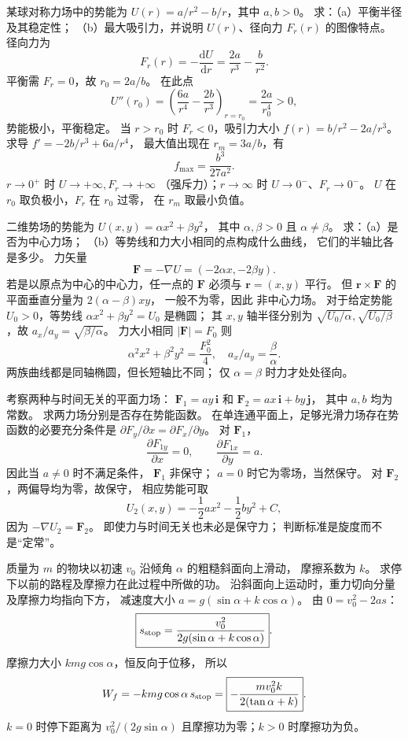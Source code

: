 某球对称力场中的势能为
$U(r)=a/r^2-b/r$，其中 $a,b>0$。
求：（a）平衡半径及其稳定性；
（b）最大吸引力，并说明 $U(r)$、径向力 $F_r(r)$ 的图像特点。
\exsolution
径向力为
\[
F_r(r)=-\frac{\mathrm dU}{\mathrm dr}
=\frac{2a}{r^3}-\frac{b}{r^2}.
\]
平衡需 $F_r=0$，故
$\boxed{r_0=2a/b}$。
在此点
\[
U''(r_0)=\left(\frac{6a}{r^4}
-\frac{2b}{r^3}\right)_{r=r_0}
=\frac{2a}{r_0^4}>0,
\]
势能极小，平衡稳定。
当 $r>r_0$ 时 $F_r<0$，吸引力大小
$f(r)=b/r^2-2a/r^3$。
求导 $f'=-2b/r^3+6a/r^4$，
最大值出现在 $r_m=3a/b$，有
\[
\boxed{f_{\max}=\frac{b^3}{27a^2}}.
\]
\excheck $r\to0^+$ 时 $U\to+\infty,F_r\to+\infty$
（强斥力）；$r\to\infty$ 时 $U\to0^-$、$F_r\to0^-$。
$U$ 在 $r_0$ 取负极小，$F_r$ 在 $r_0$ 过零，
在 $r_m$ 取最小负值。

二维势场的势能为
$U(x,y)=\alpha x^2+\beta y^2$，
其中 $\alpha,\beta>0$ 且 $\alpha\ne\beta$。
求：（a）是否为中心力场；
（b）等势线和力大小相同的点构成什么曲线，
它们的半轴比各是多少。
\exsolution
力矢量
\[
\bm F=-\nabla U=(-2\alpha x,-2\beta y).
\]
若是以原点为中心的中心力，任一点的 $\bm F$
必须与 $\bm r=(x,y)$ 平行。
但 $\bm r\times\bm F$
的平面垂直分量为 $2(\alpha-\beta)xy$，
一般不为零，因此
$\boxed{\text{非中心力场}}$。
对于给定势能 $U_0>0$，等势线
$\alpha x^2+\beta y^2=U_0$ 是椭圆；
其 $x,y$ 轴半径分别为
$\sqrt{U_0/\alpha},\sqrt{U_0/\beta}$，故
$\boxed{a_x/a_y=\sqrt{\beta/\alpha}}$。
力大小相同 $|\bm F|=F_0$ 则
\[
\alpha^2x^2+\beta^2y^2=\frac{F_0^2}{4},
\quad\boxed{a_x/a_y=\frac{\beta}{\alpha}}.
\]
\excheck 两族曲线都是同轴椭圆，但长短轴比不同；
仅 $\alpha=\beta$ 时力才处处径向。

考察两种与时间无关的平面力场：
$\bm F_1=ay\,\bm i$ 和
$\bm F_2=ax\,\bm i+by\,\bm j$，
其中 $a,b$ 均为常数。
求两力场分别是否存在势能函数。
\exsolution
在单连通平面上，足够光滑力场存在势函数的必要充分条件是
$\partial F_y/\partial x=\partial F_x/\partial y$。
对 $\bm F_1$，
\[
\frac{\partial F_{1y}}{\partial x}=0,\qquad
\frac{\partial F_{1x}}{\partial y}=a.
\]
因此当 $a\ne0$ 时不满足条件，
$\boxed{\bm F_1\text{ 非保守}}$；
$a=0$ 时它为零场，当然保守。
对 $\bm F_2$，两偏导均为零，故保守，
相应势能可取
\[
\boxed{U_2(x,y)=-\frac12ax^2-\frac12by^2+C},
\]
因为 $-\nabla U_2=\bm F_2$。
\excheck 即使力与时间无关也未必是保守力；
判断标准是旋度而不是“定常”。

质量为 $m$ 的物块以初速 $v_0$
沿倾角 $\alpha$ 的粗糙斜面向上滑动，
摩擦系数为 $k$。
求停下以前的路程及摩擦力在此过程中所做的功。
\exsolution
沿斜面向上运动时，重力切向分量及摩擦力均指向下方，
减速度大小
$a=g(\sin\alpha+k\cos\alpha)$。
由 $0=v_0^2-2as$：
\[
\boxed{s_{\rm stop}=
\frac{v_0^2}{2g(\sin\alpha+k\cos\alpha)}}.
\]
摩擦力大小 $kmg\cos\alpha$，恒反向于位移，
所以
\[
W_f=-kmg\cos\alpha\,s_{\rm stop}
=\boxed{-\frac{mv_0^2 k}
 {2(\tan\alpha+k)}}.
\]
\excheck $k=0$ 时停下距离为 $v_0^2/(2g\sin\alpha)$
且摩擦功为零；$k>0$ 时摩擦功为负。

